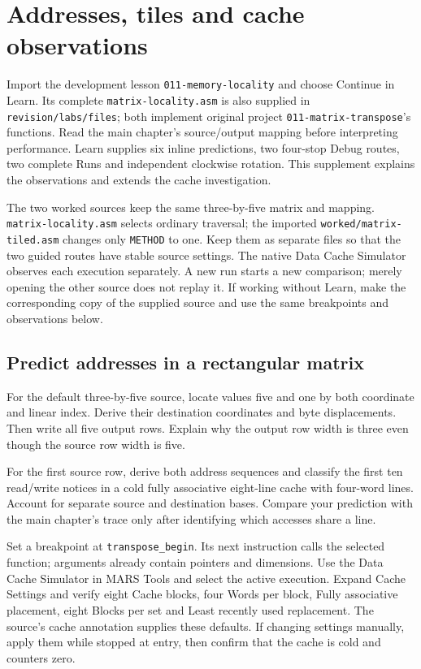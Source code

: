 \chapter{Addresses, tiles and cache observations}
\label{revision-lab:locality}

Import the development lesson \texttt{011-memory-locality} and choose Continue
in Learn. Its complete \texttt{matrix-locality.asm} is also supplied in
\texttt{revision/labs/files}; both implement original project
\texttt{011-matrix-transpose}'s functions. Read the main chapter's source/output
mapping before interpreting performance. Learn supplies six inline predictions,
two four-stop Debug routes, two complete Runs and independent clockwise rotation.
This supplement explains the observations and extends the cache investigation.

The two worked sources keep the same three-by-five matrix and mapping.
\texttt{matrix-locality.asm} selects ordinary traversal; the imported
\texttt{worked/matrix-tiled.asm} changes only \texttt{METHOD} to one. Keep them
as separate files so that the two guided routes have stable source settings.
The native Data Cache Simulator observes each execution separately. A new run
starts a new comparison; merely opening the other source does not replay it.
If working without Learn, make the corresponding copy of the supplied source
and use the same breakpoints and observations below.

\section{Predict addresses in a rectangular matrix}

For the default three-by-five source, locate values five and one by both coordinate
and linear index. Derive their destination coordinates and byte displacements.
Then write all five output rows. Explain why the output row width is three even
though the source row width is five.

For the first source row, derive both address sequences and classify the first ten
read/write notices in a cold fully associative eight-line cache with four-word
lines. Account for separate source and destination bases. Compare your prediction
with the main chapter's trace only after identifying which accesses share a line.

Set a breakpoint at \texttt{transpose\_begin}. Its next instruction calls the
selected function; arguments already contain pointers and dimensions. Use the
Data Cache Simulator in MARS Tools and select the active execution. Expand Cache
Settings and verify eight Cache blocks, four Words per block, Fully associative
placement, eight Blocks per set and Least recently used replacement. The source's
cache annotation supplies these defaults. If changing settings manually, apply
them while stopped at entry, then confirm that the cache is cold and counters zero.

